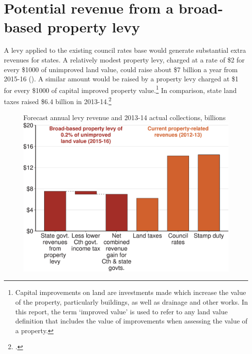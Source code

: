 \section{Potential revenue from a broad-based property levy\label{sec:PROP-3-3}}
A levy applied to the existing council rates base would generate substantial extra revenues for states. A relatively modest property levy, charged at a rate of \$2 for every \$1000 of unimproved land value, could raise about \$7 billion a year from 2015-16 (). A similar amount would be raised by a property levy charged at \$1 for every \$1000 of capital improved property value.\footnote{Capital improvements on land are investments made which increase the value of the property, particularly buildings, as well as drainage and other works. In this report, the term ‘improved value’ is used to refer to any land value definition that includes the value of improvements when assessing the value of a property.}   In comparison, state land taxes raised \$6.4 billion in 2013-14.\footcite{ABS2015h} 

\begin{figure}
%
{Forecast annual levy revenue and 2013-14 actual collections, billions}
\includegraphics[width=\columnwidth]{Property-taxes/atlas/figure/Figure5-1.pdf}

\end{figure} 

